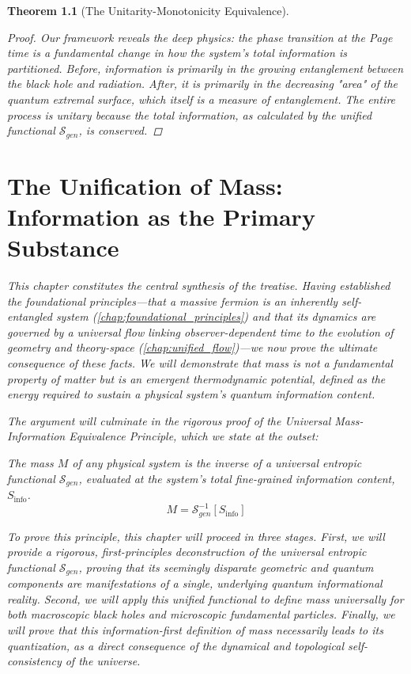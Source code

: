\documentclass[11pt, letterpaper]{report}
\theoremstyle{plain} %
\newtheorem{theorem}{Theorem}[chapter]
\theoremstyle{definition} %
\theoremstyle{remark} %
\begin{document}
\begin{theorem}[The Unitarity-Monotonicity Equivalence]
\begin{proof}
Our framework reveals the deep physics: the phase transition at the Page time is a fundamental change in how the system's total information is partitioned. Before, information is primarily in the growing entanglement between the black hole and radiation. After, it is primarily in the decreasing "area" of the quantum extremal surface, which itself is a measure of entanglement. The entire process is unitary because the total information, as calculated by the unified functional $\mathcal{S}_{gen}$, is conserved.
\end{proof}













\chapter{The Unification of Mass: Information as the Primary Substance}
\label{chap:unification_of_mass_revised}

This chapter constitutes the central synthesis of the treatise. Having established the foundational principles---that a massive fermion is an inherently self-entangled system (\cref{chap:foundational_principles}) and that its dynamics are governed by a universal flow linking observer-dependent time to the evolution of geometry and theory-space (\cref{chap:unified_flow})---we now prove the ultimate consequence of these facts. We will demonstrate that mass is not a fundamental property of matter but is an emergent thermodynamic potential, defined as the energy required to sustain a physical system's quantum information content.

The argument will culminate in the rigorous proof of the Universal Mass-Information Equivalence Principle, which we state at the outset:
\begin{center}
    \textit{The mass $M$ of any physical system is the inverse of a universal entropic functional $\mathcal{S}_{gen}$, evaluated at the system's total fine-grained information content, $S_{\text{info}}$.}
    \begin{equation}
        M = \mathcal{S}_{gen}^{-1}[S_{\text{info}}]
    \end{equation}
\end{center}
To prove this principle, this chapter will proceed in three stages. First, we will provide a rigorous, first-principles deconstruction of the universal entropic functional $\mathcal{S}_{gen}$, proving that its seemingly disparate geometric and quantum components are manifestations of a single, underlying quantum informational reality. Second, we will apply this unified functional to define mass universally for both macroscopic black holes and microscopic fundamental particles. Finally, we will prove that this information-first definition of mass necessarily leads to its quantization, as a direct consequence of the dynamical and topological self-consistency of the universe.


\end{theorem}
\end{document}
